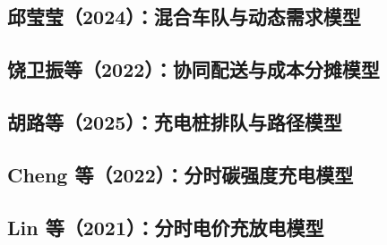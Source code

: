 \documentclass[UTF8,11pt,a4paper,fontset=none]{ctexart}
\begin{document}
\subsection{邱莹莹（2024）：混合车队与动态需求模型}


\subsection{饶卫振等（2022）：协同配送与成本分摊模型}


\subsection{胡路等（2025）：充电桩排队与路径模型}


\subsection{Cheng 等（2022）：分时碳强度充电模型}


\subsection{Lin 等（2021）：分时电价充放电模型}

\end{document}
